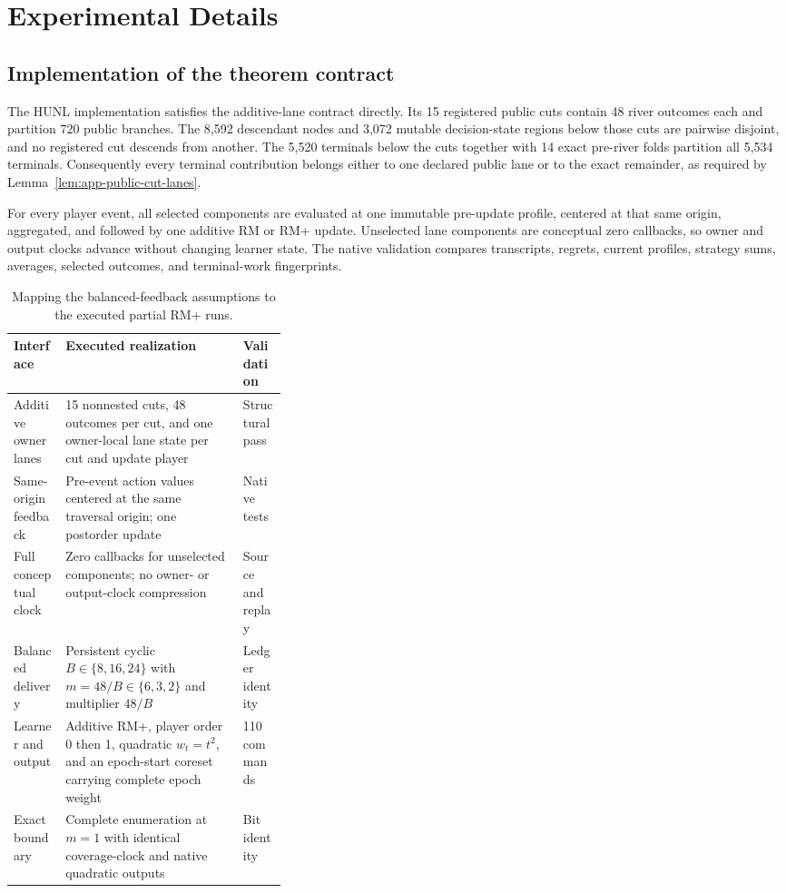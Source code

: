 \section{Experimental Details}
\label{app:registers}

\subsection{Implementation of the theorem contract}

The HUNL implementation satisfies the additive-lane contract directly.  Its
15 registered public cuts contain 48 river outcomes each and partition 720
public branches.  The 8,592 descendant nodes and 3,072 mutable decision-state
regions below those cuts are pairwise disjoint, and no registered cut descends
from another.  The 5,520 terminals below the cuts together with 14 exact
pre-river folds partition all 5,534 terminals.  Consequently every terminal
contribution belongs either to one declared public lane or to the exact
remainder, as required by Lemma~\ref{lem:app-public-cut-lanes}.

For every player event, all selected components are evaluated at one immutable
pre-update profile, centered at that same origin, aggregated, and followed by
one additive RM or RM+ update.  Unselected lane components are conceptual zero
callbacks, so owner and output clocks advance without changing learner state.
The native validation compares transcripts, regrets, current profiles,
strategy sums, averages, selected outcomes, and terminal-work fingerprints.

\begin{table}[h]
\caption{Mapping the balanced-feedback assumptions to the executed
partial RM+ runs.}
\label{tab:app-partial-instantiation}
\centering\footnotesize
\begin{tabularx}{\linewidth}{@{}p{0.19\linewidth}Xp{0.16\linewidth}@{}}
\toprule
Interface & Executed realization & Validation \\
\midrule
Additive owner lanes
& 15 nonnested cuts, 48 outcomes per cut, and one owner-local lane state per
cut and update player
& Structural pass \\
Same-origin feedback
& Pre-event action values centered at the same traversal origin; one
postorder update
& Native tests \\
Full conceptual clock
& Zero callbacks for unselected components; no owner- or output-clock
compression
& Source and replay \\
Balanced delivery
& Persistent cyclic $B\in\{8,16,24\}$ with
$m=48/B\in\{6,3,2\}$ and multiplier $48/B$
& Ledger identity \\
Learner and output
& Additive RM+, player order 0 then 1, quadratic $w_t=t^2$, and an
epoch-start coreset carrying complete epoch weight
& 110 commands \\
Exact boundary
& Complete enumeration at $m=1$ with identical coverage-clock and native
quadratic outputs
& Bit identity \\
\bottomrule
\end{tabularx}
\end{table}

